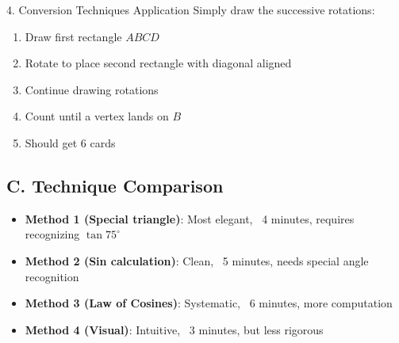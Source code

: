 \documentclass[12pt]{article}
\begin{document}
\begin{conversionbox}{4. Conversion Techniques Application}
Simply draw the successive rotations:
\begin{enumerate}
    \item Draw first rectangle $ABCD$
    \item Rotate to place second rectangle with diagonal aligned
    \item Continue drawing rotations
    \item Count until a vertex lands on $B$
    \item Should get 6 cards
\end{enumerate}

\subsection*{C. Technique Comparison}

\begin{itemize}
    \item \textbf{Method 1 (Special triangle)}: Most elegant, ~4 minutes, requires recognizing $\tan 75^\circ$
    \item \textbf{Method 2 (Sin calculation)}: Clean, ~5 minutes, needs special angle recognition
    \item \textbf{Method 3 (Law of Cosines)}: Systematic, ~6 minutes, more computation
    \item \textbf{Method 4 (Visual)}: Intuitive, ~3 minutes, but less rigorous
\end{itemize}

\end{conversionbox}
\end{document}
